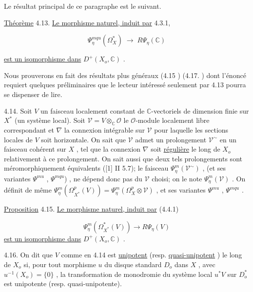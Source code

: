 Le résultat principal de ce paragraphe est le suivant.

\underline{Théorème} 4.13. \underline{Le morphisme naturel, induit par} 4.3.1,

\begin{equation}\tag{4.13.1}
\Psi^{mqu}_\eta(\Omega^*_X) \; \longrightarrow \; R\Psi_\eta(\mathbb{C}) 
\end{equation}


 \underline{est un isomorphisme dans} $D^+(X_o, \mathbb{C})$ .

Nous prouverons en fait des résultats plus généraux (4.15  ) (4.17.  ) dont l'énoncé requiert quelques préliminaires que le lecteur intéressé seulement par 4.13 pourra se dispenser de lire.

4.14. Soit $V$ un faisceau localement constant de $\mathbb{C}$-vectoriels de dimension finie sur $X^*$ (un système local). Soit $\mathcal{V} = V \otimes_{\mathbb{C}} \mathcal{O}$ le $\mathcal{O}$-module localement libre correspondant et $\nabla$ la connexion intégrable sur $\mathcal{V}$ pour laquelle les sections locales de $V$ soit horizontale. On sait que $\mathcal{V}$ admet un prolongement $\mathcal{V}^\sim$ en un faisceau cohérent sur $X$ , tel que la connexion $\nabla$ soit \underline{régulière} le long de $X_o$ relativement à ce prolongement. On sait aussi que deux tels prolongements sont méromorphiquement équivalents ([1] II 5.7); le faisceau $\Psi^m_\eta(\mathcal{V}^\sim)$ , (et ses variantes $\Psi^{mu}$ , $\Psi^{mqu}$) , ne dépend donc pas du $\mathcal{V}$ choisi; on le note $\Psi^m_\eta(\mathcal{V})$ . On définit de même $\Psi^m_\eta(\Omega^p_{X^*}(V)) = \Psi^m_\eta(\Omega^p_X \otimes \mathcal{V})$ , et ses variantes $\Psi^{mu}$ , $\Psi^{mqu}$ .

\underline{Proposition} 4.15. \underline{Le morphisme naturel, induit par} (4.4.1)

\begin{equation}\tag{4.15.1}
\Psi^m_\eta(\Omega^*_{X^*}(V)) \longrightarrow R\Psi_\eta(V)
\end{equation}
\underline{est un isomorphisme dans} $D^+(X_o, \mathbb{C})$ .

4.16. On dit que $V$ comme en 4.14 est \underline{unipotent} (resp. \underline{quasi-unipotent} ) le long de $X_o$ si, pour tout morphisme $u$ du disque standard $D_o$ dans $X$ , avec $u^{-1}(X_o) = \{0\}$ , la transformation de monodromie du système local $u^*V$ sur $D_o^*$ est unipotente (resp. quasi-unipotente).

